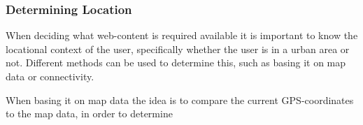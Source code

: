 \subsubsection{Determining Location}

When deciding what web-content is required available it is important to know the locational context of the user, specifically whether the user is in a urban area or not. Different methods can be used to determine this, such as basing it on map data or connectivity.

When basing it on map data the idea is to compare the current GPS-coordinates to the map data, in order to determine 